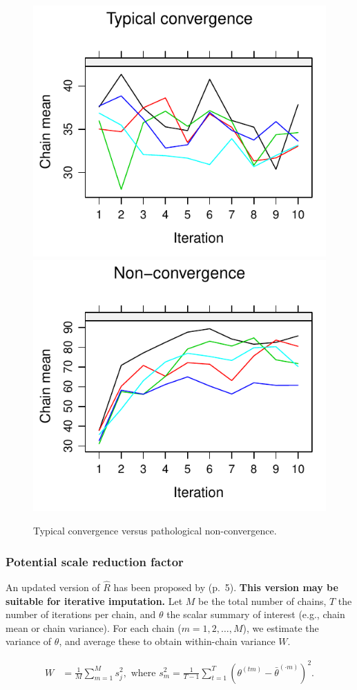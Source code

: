 \documentclass[Royal,times,sageh]{sagej}
\begin{document}
\begin{figure}

{\centering \includegraphics[width=.49\linewidth]{manuscript_files/figure-latex/non-conv-1} \includegraphics[width=.49\linewidth]{manuscript_files/figure-latex/non-conv-2} 

}

\caption{Typical convergence versus pathological non-convergence.}\label{fig:non-conv}
\end{figure}

\hypertarget{potential-scale-reduction-factor}{%
\subsubsection{Potential scale reduction
factor}\label{potential-scale-reduction-factor}}

An updated version of \(\widehat{R}\) has been proposed by
\citet{veht19} (p.~5). \textbf{This version may be suitable for
iterative imputation.} Let \(M\) be the total number of chains, \(T\)
the number of iterations per chain, and \(\theta\) the scalar summary of
interest (e.g., chain mean or chain variance). For each chain
(\(m = 1, 2, \dots, M\)), we estimate the variance of \(\theta\), and
average these to obtain within-chain variance \(W\).

\begin{align*}
W&=\frac{1}{M} \sum_{m=1}^{M} s_{j}^{2}, \text { where } s_{m}^{2}=\frac{1}{T-1} \sum_{t=1}^{T}\left(\theta^{(t m)}-\bar{\theta}^{(\cdot m)}\right)^{2}. 
\end{align*}
\end{document}
